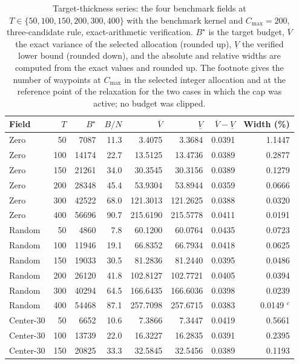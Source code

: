 \begin{table}[!tbp]\centering\footnotesize\setlength{\tabcolsep}{4pt}
\caption{Target-thickness series: the four benchmark fields at $T\in\{50,100,150,200,300,400\}$
with the benchmark kernel and $C_{\max}=200$, three-candidate rule, exact-arithmetic verification.
$B^\star$ is the target budget, $\overline V$ the exact variance of the selected allocation
(rounded up), $\underline V$ the verified lower bound (rounded down), and the absolute and
relative widths are computed from the exact values and rounded up. The footnote gives the number
of waypoints at $C_{\max}$ in the selected integer allocation and at the reference point of the
relaxation for the two cases in which the cap was active; no budget was clipped.}
\label{tab:target-series-si}
\begin{tabular}{lrrrrrrr}
\toprule
Field & $T$ & $B^\star$ & $B/N$ & $\overline V$ & $\underline V$ & $\overline V-\underline V$ & Width (\%) \\
\midrule
Zero & 50 & 7087 & 11.3 & 3.4075 & 3.3684 & 0.0391 & 1.1447\\
Zero & 100 & 14174 & 22.7 & 13.5125 & 13.4736 & 0.0389 & 0.2877\\
Zero & 150 & 21261 & 34.0 & 30.3545 & 30.3156 & 0.0389 & 0.1279\\
Zero & 200 & 28348 & 45.4 & 53.9304 & 53.8944 & 0.0359 & 0.0666\\
Zero & 300 & 42522 & 68.0 & 121.3013 & 121.2625 & 0.0388 & 0.0320\\
Zero & 400 & 56696 & 90.7 & 215.6190 & 215.5778 & 0.0411 & 0.0191\\
\addlinespace[2pt]
Random & 50 & 4860 & 7.8 & 60.1200 & 60.0764 & 0.0435 & 0.0723\\
Random & 100 & 11946 & 19.1 & 66.8352 & 66.7934 & 0.0418 & 0.0625\\
Random & 150 & 19033 & 30.5 & 81.2836 & 81.2440 & 0.0395 & 0.0486\\
Random & 200 & 26120 & 41.8 & 102.8127 & 102.7721 & 0.0405 & 0.0394\\
Random & 300 & 40294 & 64.5 & 166.6435 & 166.6036 & 0.0398 & 0.0239\\
Random & 400 & 54468 & 87.1 & 257.7098 & 257.6715 & 0.0383 & 0.0149 $^{c}$\\
\addlinespace[2pt]
Center-30 & 50 & 6652 & 10.6 & 7.3866 & 7.3447 & 0.0419 & 0.5661\\
Center-30 & 100 & 13739 & 22.0 & 16.3227 & 16.2835 & 0.0391 & 0.2395\\
Center-30 & 150 & 20825 & 33.3 & 32.5845 & 32.5456 & 0.0389 & 0.1193\\

\end{tabular}
\end{table}
